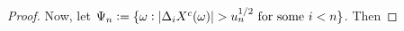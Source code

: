 \begin{proof}
\begin{comment}
$\Omega_q := \{\omega : \mu(\omega, \domain  \times \{\vert x \vert > 1\} ) \le q \}$, for     $q \in \nats$. It is easily seen that $\p(\Omega_q) \to 1$ as $q \to \infty$. Set $\Omega(n, q) := \Omega_n \cap \Omega_q$. Now note that   $\e(\gamma^3_i I_{\Omega(n,q)}) \le q \e(\djt I_{G^1_i}) \le c q \Delta_n^{3/2} u_n^{-1/2}$. So that given positive $\eta$,
\begin{align} 
  \p( \sup_{t \in \domain}&\vert \sumnt \sumin \btghki \gamma^3_i \ghk(t)\vert > \eta) \notag \\ &\le \p(\Omega(n,q)^c) + cqH^n (u^{-1}_n\Delta_n)^{1/2}, \notag \end{align}
which can be made arbitrarily small by  choosing $n,q$ large enough and letting $n \to \infty$.  Similarly note that $\e(\gamma^4_i I_{\Omega(n,q)}) \le q \e(\djt I_{G^2_i}) \le c q \Delta_n u_n^{-1/4}$. So that 
\begin{align} 
  \p( \sup_{t \in \domain}\vert \sumnt \sumin \btghki \gamma^4_i \ghk(t)\vert > \eta) \le \p(\Omega(n,q)^c) + cqH^n u^{-1/4}_n\Delta_n, \notag \end{align}
which can be made as small as desired. This completes the demonstration  that 
\begin{align}
  \p(\sup_{t \in \domain} \vert \sumnt q_{h,k} \ghk(t) \vert > \eta) \to 0.\notag
  \label{}
\end{align}
Now, arguing as in Theorem 4.1 of \cite{Mancini2009}, note that on $ A_i \cap C_i^c$, it is the case that  $2u_n^{1/2} - \vert \dxf \vert < \vert \djt\vert - \vert \dxf\vert \le \vert \dx \vert \le u_n^{1/2}$, so that $u_n^{1/2} < \vert \dxf \vert < \vert \djl \vert + \vert \dxc \vert $. In turn, the last inequality implies that either $\vert \djl \vert > u^{1/2}_n/2$ or  $\vert \dxc \vert > u^{1/2}_n/2$. Now, for sufficiently large $n$, it is almost surely never the case that $\vert \dxc \vert > u^{1/2}_n/2$ for some $i$,  $0 \le  i  \le n -1$. Hence,  for positive $\delta$, \begin{align} \p(\vert&\sumt q_{h,k} \ghk(t) \vert > \delta/2) \notag \\ &\le \p(    \cup_i\{ \mu( (t_i, t_{i+1}] \times \{\vert x \vert > 1 \} ) > 0,  (\djt)^2 > u_n\}) \notag \\ & \le c n^{-1} \kappa u_n^{-1}.\end{align}
\end{comment}
Now, let $\Psi_n := \{\omega: \vert \Delta_i X^c(\omega) \vert > u_n^{1/2} \text{ for some } i < n\}$.  Then 

\end{proof}
